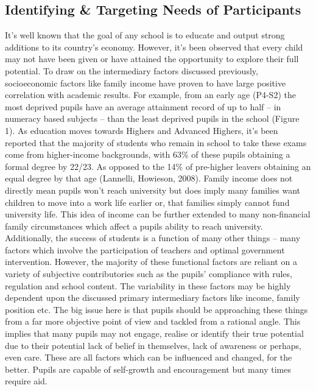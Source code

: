 \documentclass[11pt, english]{article}
\begin{document}
	\subsection{Identifying \& Targeting Needs of Participants}

	It's well known that the goal of any school is to educate and output strong additions to its country's economy. However, it's been observed that every child may not have been given or have attained the opportunity to explore their full potential. To draw on the intermediary factors discussed previously, socioeconomic factors like family income have proven to have large positive correlation with academic results. For example, from an early age (P4-S2) the most deprived pupils have an average attainment record of up to half – in numeracy based subjects – than the least deprived pupils in the school (Figure 1). As education moves towards Highers and Advanced Highers, it's been reported that the majority of students who remain in school to take these exams come from higher-income backgrounds, with 63\% of these pupils obtaining a formal degree by 22/23. As opposed to the 14\% of pre-higher leavers obtaining an equal degree by that age (Lannelli, Howieson, 2008). Family income does not directly mean pupils won't reach university but does imply many families want children to move into a work life earlier or, that families simply cannot fund university life. This idea of income can be further extended to many non-financial family circumstances which affect a pupils ability to reach university.\\

	Additionally, the success of students is a function of many other things – many factors which involve the participation of teachers and optimal government intervention. However, the majority of these functional factors are reliant on a variety of subjective contributories such as the pupils' compliance with rules, regulation and school content. The variability in these factors may be highly dependent upon the discussed primary intermediary factors like income, family position etc. The big issue here is that pupils should be approaching these things from a far more objective point of view and tackled from a rational angle. This implies that many pupils may not engage, realise or identify their true potential due to their potential lack of belief in themselves, lack of awareness or perhaps, even care. These are all factors which can be influenced and changed, for the better. Pupils are capable of self-growth and encouragement but many times require aid.\\
\end{document}
